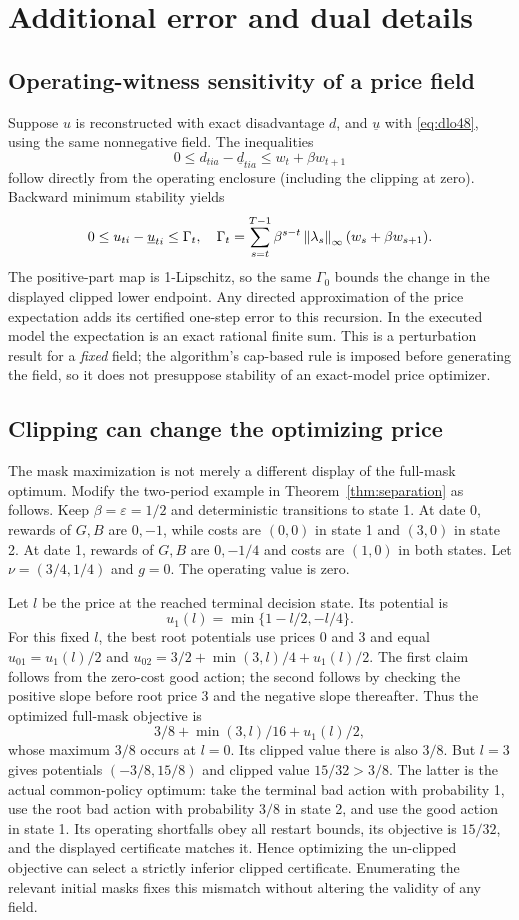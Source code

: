 \appendix
\section{Additional error and dual details}\label{app:details48}
\subsection{Operating-witness sensitivity of a price field}
Suppose $u$ is reconstructed with exact disadvantage $d$, and $\underline u$ with \eqref{eq:dlo48}, using the same nonnegative field. The inequalities
\[
 0\le d_{tia}-\underline d_{tia}\le w_t+\beta w_{t+1}
\]
follow directly from the operating enclosure (including the clipping at zero). Backward minimum stability yields
\[
 0\le u_{ti}-\underline u_{ti}\le\Gamma_t,
 \quad \Gamma_t=\sum_{s=t}^{T-1}\beta^{s-t}\left\|\lambda_s\right\|_\infty(w_s+\beta w_{s+1}).
\]
The positive-part map is 1-Lipschitz, so the same $\Gamma_0$ bounds the change in the displayed clipped lower endpoint. Any directed approximation of the price expectation adds its certified one-step error to this recursion. In the executed model the expectation is an exact rational finite sum. This is a perturbation result for a \emph{fixed} field; the algorithm's cap-based rule is imposed before generating the field, so it does not presuppose stability of an exact-model price optimizer.

\subsection{Clipping can change the optimizing price}\label{app:clipping48}
The mask maximization is not merely a different display of the full-mask optimum. Modify the two-period example in Theorem~\ref{thm:separation} as follows. Keep $\beta=\varepsilon=1/2$ and deterministic transitions to state 1. At date 0, rewards of $G,B$ are $0,-1$, while costs are $(0,0)$ in state 1 and $(3,0)$ in state 2. At date 1, rewards of $G,B$ are $0,-1/4$ and costs are $(1,0)$ in both states. Let $\nu=(3/4,1/4)$ and $g=0$. The operating value is zero.

Let $l$ be the price at the reached terminal decision state. Its potential is
\[
 u_1(l)=\min\{1-l/2,-l/4\}.
\]
For this fixed $l$, the best root potentials use prices 0 and 3 and equal $u_{01}=u_1(l)/2$ and $u_{02}=3/2+\min(3,l)/4+u_1(l)/2$. The first claim follows from the zero-cost good action; the second follows by checking the positive slope before root price 3 and the negative slope thereafter. Thus the optimized full-mask objective is
\[
 3/8+\min(3,l)/16+u_1(l)/2,
\]
whose maximum $3/8$ occurs at $l=0$. Its clipped value there is also $3/8$. But $l=3$ gives potentials $(-3/8,15/8)$ and clipped value $15/32>3/8$. The latter is the actual common-policy optimum: take the terminal bad action with probability 1, use the root bad action with probability $3/8$ in state 2, and use the good action in state 1. Its operating shortfalls obey all restart bounds, its objective is $15/32$, and the displayed certificate matches it. Hence optimizing the un-clipped objective can select a strictly inferior clipped certificate. Enumerating the relevant initial masks fixes this mismatch without altering the validity of any field.


